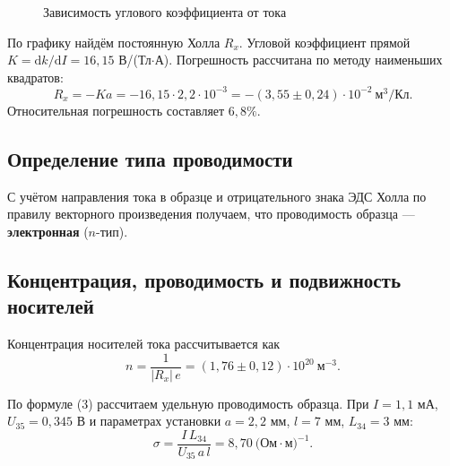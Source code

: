 \documentclass{article}
\begin{document}
\begin{figure}[H]
	\centering
	\caption{Зависимость углового коэффициента от тока}
	\label{fig:k}
\end{figure}

По графику найдём постоянную Холла $R_x$. Угловой коэффициент прямой $K = \mathrm{d}k/\mathrm{d}I = 16{,}15$ В/(Тл$\cdot$А). Погрешность рассчитана по методу наименьших квадратов:
\begin{equation}
	R_x = -K a = -16{,}15 \cdot 2{,}2\cdot 10^{-3}
	= -(3{,}55 \pm 0{,}24)\cdot 10^{-2}\ \text{м}^3/\text{Кл}.
\end{equation}
Относительная погрешность составляет $6{,}8\%$.

\subsection{Определение типа проводимости}
С учётом направления тока в образце и отрицательного знака ЭДС Холла по правилу векторного произведения получаем, что проводимость образца — \textbf{электронная} ($n$-тип).

\subsection{Концентрация, проводимость и подвижность носителей}
Концентрация носителей тока рассчитывается как
\begin{equation}
	n = \frac{1}{|R_x|\,e} = (1{,}76 \pm 0{,}12)\cdot 10^{20}\ \text{м}^{-3}.
\end{equation}

По формуле (3) рассчитаем удельную проводимость образца. При $I = 1{,}1$ мА, $U_{35} = 0{,}345$ В и параметрах установки $a = 2{,}2$ мм, $l = 7$ мм, $L_{34} = 3$ мм:
\begin{equation}
	\sigma = \frac{I\,L_{34}}{U_{35}\,a\,l}
	= 8{,}70\ \text{(Ом}\cdot\text{м)}^{-1}.
\end{equation}
\end{document}
